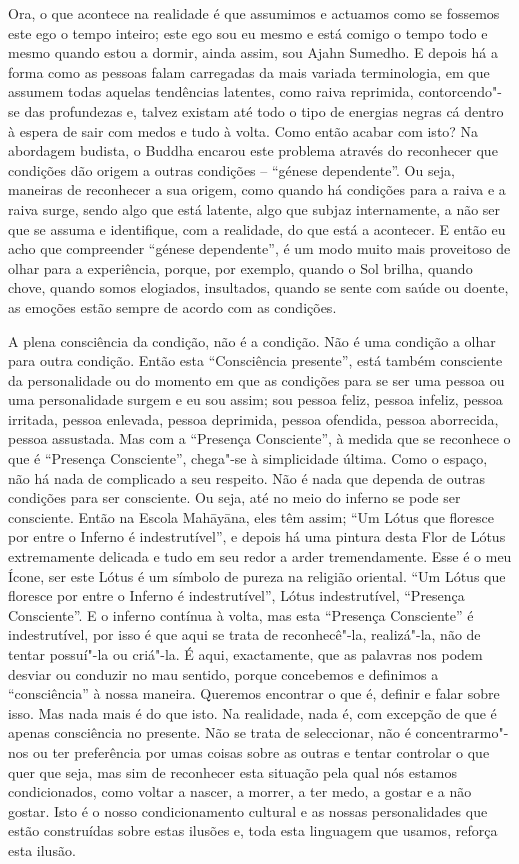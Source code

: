Ora, o que acontece na realidade é que assumimos e actuamos como se
fossemos este ego o tempo inteiro; este ego sou eu mesmo e está comigo o
tempo todo e mesmo quando estou a dormir, ainda assim, sou Ajahn
Sumedho. E depois há a forma como as pessoas falam carregadas da mais
variada terminologia, em que assumem todas aquelas tendências latentes,
como raiva reprimida, contorcendo"-se das profundezas e, talvez existam
até todo o tipo de energias negras cá dentro à espera de sair com medos
e tudo à volta. Como então acabar com isto? Na abordagem budista, o
Buddha encarou este problema através do reconhecer que condições dão
origem a outras condições -- ``génese dependente''. Ou seja, maneiras de
reconhecer a sua origem, como quando há condições para a raiva e a raiva
surge, sendo algo que está latente, algo que subjaz internamente, a não
ser que se assuma e identifique, com a realidade, do que está a
acontecer. E então eu acho que compreender ``génese dependente'', é um
modo muito mais proveitoso de olhar para a experiência, porque, por
exemplo, quando o Sol brilha, quando chove, quando somos elogiados,
insultados, quando se sente com saúde ou doente, as emoções estão sempre
de acordo com as condições.

A plena consciência da condição, não é a condição. Não é uma condição a
olhar para outra condição. Então esta ``Consciência presente'', está
também consciente da personalidade ou do momento em que as condições
para se ser uma pessoa ou uma personalidade surgem e eu sou assim; sou
pessoa feliz, pessoa infeliz, pessoa irritada, pessoa enlevada, pessoa
deprimida, pessoa ofendida, pessoa aborrecida, pessoa assustada. Mas com
a ``Presença Consciente'', à medida que se reconhece o que é ``Presença
Consciente'', chega"-se à simplicidade última. Como o espaço, não há nada
de complicado a seu respeito. Não é nada que dependa de outras condições
para ser consciente. Ou seja, até no meio do inferno se pode ser
consciente. Então na Escola Mahāyāna, eles têm assim; ``Um Lótus que
floresce por entre o Inferno é indestrutível'', e depois há uma pintura
desta Flor de Lótus extremamente delicada e tudo em seu redor a arder
tremendamente. Esse é o meu Ícone, ser este Lótus é um símbolo de pureza
na religião oriental. ``Um Lótus que floresce por entre o Inferno é
indestrutível'', Lótus indestrutível, ``Presença Consciente''. E o
inferno contínua à volta, mas esta ``Presença Consciente'' é
indestrutível, por isso é que aqui se trata de reconhecê"-la, realizá"-la,
não de tentar possuí"-la ou criá"-la. É aqui, exactamente, que as palavras
nos podem desviar ou conduzir no mau sentido, porque concebemos e
definimos a ``consciência'' à nossa maneira. Queremos encontrar o que é,
definir e falar sobre isso. Mas nada mais é do que isto. Na realidade,
nada é, com excepção de que é apenas consciência no presente. Não se
trata de seleccionar, não é concentrarmo"-nos ou ter preferência por umas
coisas sobre as outras e tentar controlar o que quer que seja, mas sim
de reconhecer esta situação pela qual nós estamos condicionados, como
voltar a nascer, a morrer, a ter medo, a gostar e a não gostar. Isto é o
nosso condicionamento cultural e as nossas personalidades que estão
construídas sobre estas ilusões e, toda esta linguagem que usamos,
reforça esta ilusão.

